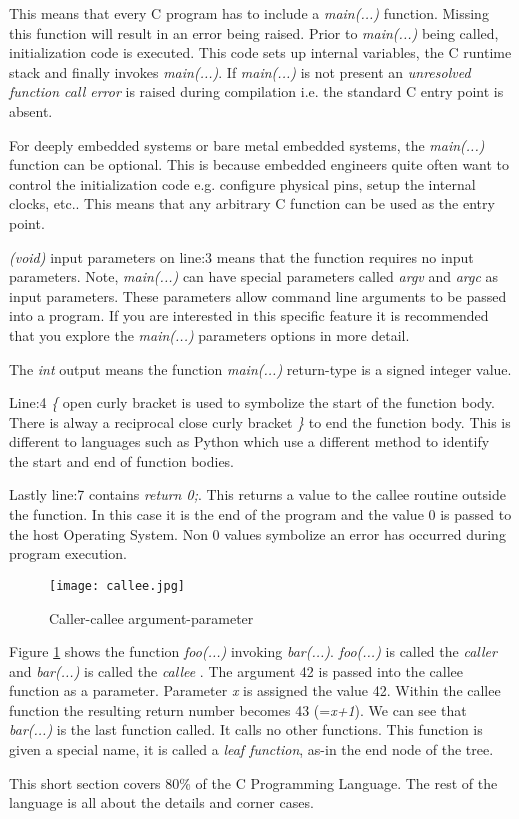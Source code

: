 This means that every C program has to include a \textit{main(...)} function. Missing this function will result in an error being raised. Prior to \textit{main(...)} being called, initialization code is executed. This code sets up internal variables, the C runtime stack and finally invokes \textit{main(...)}. If \textit{main(...)} is not present an \textit{unresolved function call error} is raised during compilation i.e. the standard C entry point is absent.

For deeply embedded systems or bare metal embedded systems, the \textit{main(...)} function can be optional. This is because embedded engineers quite often want to control the initialization code e.g. configure physical pins, setup the internal clocks, etc.. This means that any arbitrary C function can be used as the entry point. 

\textit{(void)} input parameters on line:3 means that the function requires no input parameters. Note, \textit{main(...)} can have special parameters called \textit{argv} and \textit{argc} as input parameters. These parameters allow command line arguments to be passed into a program. If you are interested in this specific feature it is recommended that you explore the \textit{main(...)} parameters options in more detail.

The \textit{int} output means the function \textit{main(...)} return-type is a signed integer value.

Line:4 \textit{\{} open curly bracket is used to symbolize the start of the function body. There is alway a reciprocal close curly bracket \textit{\}} to end the function body. This is different to languages such as Python which use a different method to identify the start and end of function bodies.

Lastly line:7 contains \textit{return 0;}.  This returns a value to the callee routine outside the function. In this case it is the end of the program and the value 0 is passed to the host Operating System. Non 0 values symbolize an error has occurred during program execution.

\begin{figure}[H]
\texttt{[image: callee.jpg]}
\caption{Caller-callee argument-parameter}
\label{figure:callee}
\end{figure}

Figure \ref{figure:callee} shows the function \textit{foo(...)} invoking \textit{bar(...)}. \textit{foo(...)} is called the \textit{caller}  and \textit{bar(...)} is called the \textit{callee} . The argument 42 is passed into the callee function as a parameter.   Parameter \textit{x} is assigned the value 42. Within the callee function the resulting return number becomes 43 (=\textit{x+1}). We can see that \textit{bar(...)} is the last function called. It calls no other functions. This function is given a special name, it is called a \textit{leaf function}, as-in the end node of the tree. 

This short section covers 80\% of the C Programming Language. The rest of the language is all about the details and corner cases.





